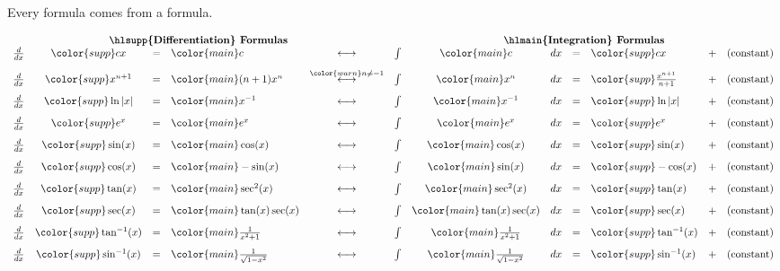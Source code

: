 \documentclass[../main.tex]{subfiles}
\begin{document}
  Every  formula comes from a  formula.

  \[
    \begin{array}{rcclcrclllcl} 
      \multicolumn{5}{c}{\text{\textbf{\hlsupp{Differentiation} Formulas}}} & \multicolumn{7}{c}{\text{\textbf{\hlmain{Integration} Formulas}}} \\
      \frac{d}{dx} & {\color{supp} cx} &=& {\color{main} c}
                   & \longleftrightarrow 
                   & \int & {\color{main} c} & dx &=& {\color{supp} cx} 
                   &+& (\text{constant}) \\[2ex]
      \frac{d}{dx} & {\color{supp} x^{n+1}  } &=& {\color{main} (n+1) x^{n}}
                   & \overset{\color{warn} n \ne -1}{\longleftrightarrow}
                   & \int & {\color{main} x^{n}} & dx &=& {\color{supp} \frac{x^{n+1}}{n+1} } 
                   &+& (\text{constant}) \\[2ex]
      \frac{d}{dx} & {\color{supp} \ln|x| } &=& {\color{main} x^{-1}}
                   & \longleftrightarrow 
                   & \int & {\color{main} x^{-1}} & dx &=& {\color{supp} \ln|x|} 
                   &+& (\text{constant}) \\[2ex]
      \frac{d}{dx} & {\color{supp} e^{x}} &=& {\color{main} e^{x}}
                   & \longleftrightarrow
                   & \int & {\color{main} e^{x}      } & dx &=& {\color{supp} e^{x}} 
                   &+& (\text{constant}) \\[2ex]
      \frac{d}{dx} & {\color{supp} \sin(x)} &=& {\color{main} \cos(x)}
                   & \longleftrightarrow 
                   & \int & {\color{main} \cos(x)} & dx &=& {\color{supp} \sin(x)} 
                   &+& (\text{constant}) \\[2ex]
      \frac{d}{dx} & {\color{supp} \cos(x)} &=& {\color{main} -\sin(x)}
                   & \longleftrightarrow 
                   & \int & {\color{main} \sin(x)} & dx &=& {\color{supp} -\cos(x)} 
                   &+& (\text{constant}) \\[2ex]
      \frac{d}{dx} & {\color{supp} \tan(x)} &=& {\color{main} \sec^{2}(x)}
                   & \longleftrightarrow 
                   & \int & {\color{main} \sec^{2}(x)} & dx &=& {\color{supp} \tan(x)} 
                   &+& (\text{constant}) \\[2ex]
      \frac{d}{dx} & {\color{supp} \sec(x)} &=& {\color{main} \tan(x)\sec(x)}
                   & \longleftrightarrow 
                   & \int & {\color{main} \tan(x)\sec(x)} & dx &=& {\color{supp} \sec(x)} 
                   &+& (\text{constant}) \\[2ex]
      \frac{d}{dx} & {\color{supp} \arctan(x)} &=& {\color{main} \frac{1}{x^{2}+1}}
                   & \longleftrightarrow 
                   & \int & {\color{main} \frac{1}{x^{2} + 1}} & dx &=& {\color{supp} \arctan(x)} 
                   &+& (\text{constant}) \\[2ex]
      \frac{d}{dx} & {\color{supp} \arcsin(x)} &=& {\color{main} \frac{1}{\sqrt{1 - x^{2}}}}
                   & \longleftrightarrow 
                   & \int & {\color{main} \frac{1}{\sqrt{1 - x^{2}}}} & dx &=& {\color{supp} \arcsin(x)} 
                   &+& (\text{constant})
    \end{array}
  \]
\end{document}
